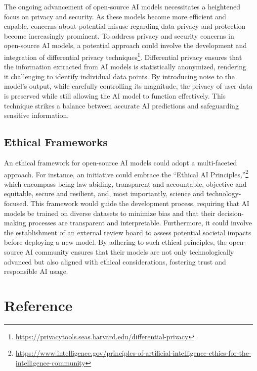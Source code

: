 \documentclass[
]{book}
\begin{document}
The ongoing advancement of open-source AI models necessitates a heightened focus on privacy and security. As these models become more efficient and capable, concerns about potential misuse regarding data privacy and protection become increasingly prominent. To address privacy and security concerns in open-source AI models, a potential approach could involve the development and integration of differential privacy techniques\footnote{\url{https://privacytools.seas.harvard.edu/differential-privacy}}. Differential privacy ensures that the information extracted from AI models is statistically anonymized, rendering it challenging to identify individual data points. By introducing noise to the model's output, while carefully controlling its magnitude, the privacy of user data is preserved while still allowing the AI model to function effectively. This technique strikes a balance between accurate AI predictions and safeguarding sensitive information.

\hypertarget{ethical-frameworks}{%
\section{Ethical Frameworks}\label{ethical-frameworks}}

An ethical framework for open-source AI models could adopt a multi-faceted approach. For instance, an initiative could embrace the ``Ethical AI Principles,''\footnote{\url{https://www.intelligence.gov/principles-of-artificial-intelligence-ethics-for-the-intelligence-community}} which encompass being law-abiding, transparent and accountable, objective and equitable, secure and resilient, and, most importantly, science and technology-focused. This framework would guide the development process, requiring that AI models be trained on diverse datasets to minimize bias and that their decision-making processes are transparent and interpretable. Furthermore, it could involve the establishment of an external review board to assess potential societal impacts before deploying a new model. By adhering to such ethical principles, the open-source AI community ensures that their models are not only technologically advanced but also aligned with ethical considerations, fostering trust and responsible AI usage.

\hypertarget{reference}{%
\chapter{Reference}\label{reference}}

  
\end{document}
